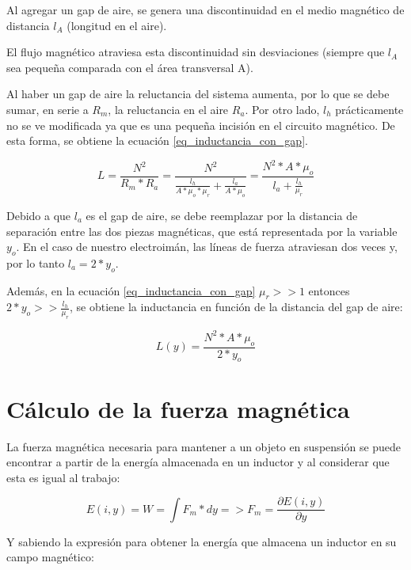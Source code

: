 \noindent Al agregar un gap de aire, se genera una discontinuidad en el medio magnético de distancia $l_{A}$ (longitud en el aire).

\noindent El flujo magnético atraviesa esta discontinuidad sin desviaciones (siempre que $l_{A}$ sea pequeña comparada con el área transversal A).

\noindent Al haber un gap de aire la reluctancia del sistema aumenta, por lo que se debe sumar, en serie a $R_{m}$, la reluctancia en el aire $R_{a}$. Por otro lado, $l_{h}$ prácticamente no se ve modificada ya que es una pequeña incisión en el circuito magnético. De esta forma, se obtiene la ecuación \ref{eq_inductancia_con_gap}.

\begin{equation}\label{eq_inductancia_con_gap}
L=\frac{N^{2}}{R_{m}*R_{a}}=\frac{N^{2}}{\frac{l_{h}}{A*\mu_{o}*\mu_{r}}+\frac{l_{a}}{A*\mu_{o}}}=\frac{N^{2}*A*\mu_{o}}{l_{a}+\frac{l_{h}}{\mu_{r}}}
\end{equation}

\noindent Debido a que $l_{a}$ es el gap de aire, se debe reemplazar por la distancia de separación entre las dos piezas magnéticas, que está representada por la variable $y_{o}$. En el caso de nuestro electroimán, las líneas de fuerza atraviesan dos veces y, por lo tanto $l_{a}=2*y_{o}$.

\noindent Además, en la ecuación \ref{eq_inductancia_con_gap} $\mu_{r}>>1$ entonces $2*y_{o}>>\frac{l_{h}}{\mu_{r}}$, se obtiene la inductancia en función de la distancia del gap de aire:

\begin{equation}\label{eq_inductancia_vs_y}
		L(y)=\frac{{N^{2}*A*\mu_{o}}}{2*y_{o}}
\end{equation}

\section{Cálculo de la fuerza magnética}

\noindent La fuerza magnética necesaria para mantener a un objeto en suspensión se puede encontrar a partir de la energía almacenada en un inductor y al considerar que esta es  igual al trabajo:

\begin{equation}\label{eq_energia}
	E(i,y)=W=\int{F_{m}*dy}=>F_{m}=\frac{\partial{E(i,y)}}{\partial{y}}
\end{equation}

\noindent Y sabiendo la expresión para obtener la energía que almacena un inductor en su campo magnético:

